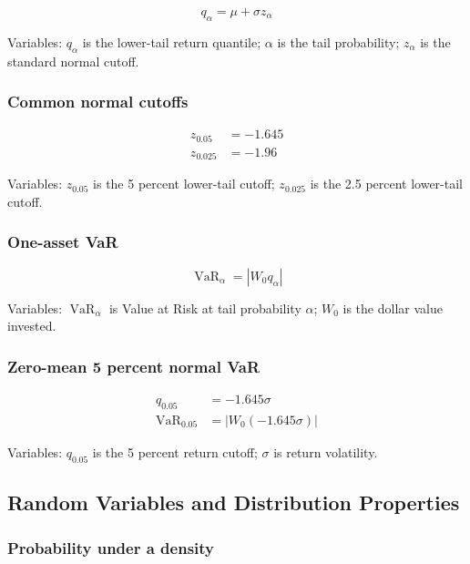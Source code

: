 \documentclass[
  8pt,
  twocolumn]{extarticle}
\begin{document}
\[
q_\alpha=\mu+\sigma z_\alpha
\]

Variables: \(q_\alpha\) is the lower-tail return quantile; \(\alpha\) is
the tail probability; \(z_\alpha\) is the standard normal cutoff.

\subsubsection{Common normal cutoffs}\label{common-normal-cutoffs}

\[
\begin{aligned}
z_{0.05}&=-1.645\\
z_{0.025}&=-1.96
\end{aligned}
\]

Variables: \(z_{0.05}\) is the 5 percent lower-tail cutoff;
\(z_{0.025}\) is the 2.5 percent lower-tail cutoff.

\subsubsection{One-asset VaR}\label{one-asset-var}

\[
\operatorname{VaR}_\alpha=|W_0q_\alpha|
\]

Variables: \(\operatorname{VaR}_\alpha\) is Value at Risk at tail
probability \(\alpha\); \(W_0\) is the dollar value invested.

\subsubsection{Zero-mean 5 percent normal
VaR}\label{zero-mean-5-percent-normal-var}

\[
\begin{aligned}
q_{0.05}&=-1.645\sigma\\
\operatorname{VaR}_{0.05}&=|W_0(-1.645\sigma)|
\end{aligned}
\]

Variables: \(q_{0.05}\) is the 5 percent return cutoff; \(\sigma\) is
return volatility.

\subsection{Random Variables and Distribution
Properties}\label{random-variables-and-distribution-properties}

\subsubsection{Probability under a
density}\label{probability-under-a-density}
\end{document}
